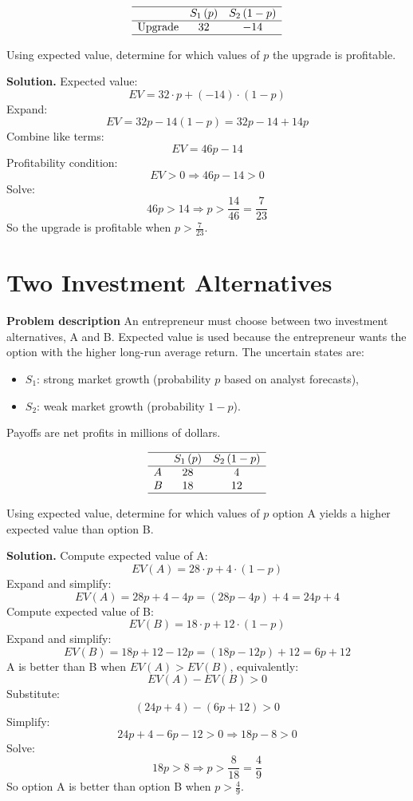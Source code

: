 \begin{ExamProblems}
		\[
		\begin{array}{lcc}
			\hline
			& S_1\,(p) & S_2\,(1-p) \\
			\hline
			\text{Upgrade} & 32 & -14 \\
			\hline
		\end{array}
		\]
		
		Using expected value, determine for which values of \(p\) the upgrade is profitable.
		
		\textbf{Solution.}
		Expected value:
		\[
		EV = 32\cdot p + (-14)\cdot(1-p)
		\]
		Expand:
		\[
		EV = 32p - 14(1-p) = 32p - 14 + 14p
		\]
		Combine like terms:
		\[
		EV = 46p - 14
		\]
		Profitability condition:
		\[
		EV>0 \Rightarrow 46p-14>0
		\]
		Solve:
		\[
		46p>14 \Rightarrow p>\frac{14}{46}=\frac{7}{23}
		\]
		So the upgrade is profitable when \(p>\frac{7}{23}\).
		
		
		\hypertarget{c7-ex3}{}
		\item
		\section{Two Investment Alternatives}
		
		\textbf{Problem description}
		An entrepreneur must choose between two investment alternatives, A and B. Expected value is used because the entrepreneur wants the option with the higher long-run average return. The uncertain states are:
		\begin{itemize}
			\item \(S_1\): strong market growth (probability \(p\) based on analyst forecasts),
			\item \(S_2\): weak market growth (probability \(1-p\)).
		\end{itemize}
		Payoffs are net profits in millions of dollars.
		
		\[
		\begin{array}{lcc}
			\hline
			& S_1\,(p) & S_2\,(1-p) \\
			\hline
			A & 28 & 4 \\
			B & 18 & 12 \\
			\hline
		\end{array}
		\]
		
		Using expected value, determine for which values of \(p\) option A yields a higher expected value than option B.
		
		\textbf{Solution.}
		Compute expected value of A:
		\[
		EV(A)=28\cdot p + 4\cdot(1-p)
		\]
		Expand and simplify:
		\[
		EV(A)=28p + 4 - 4p = (28p-4p)+4 = 24p+4
		\]
		Compute expected value of B:
		\[
		EV(B)=18\cdot p + 12\cdot(1-p)
		\]
		Expand and simplify:
		\[
		EV(B)=18p + 12 - 12p = (18p-12p)+12 = 6p+12
		\]
		A is better than B when \(EV(A)>EV(B)\), equivalently:
		\[
		EV(A)-EV(B)>0
		\]
		Substitute:
		\[
		(24p+4)-(6p+12)>0
		\]
		Simplify:
		\[
		24p+4-6p-12>0 \Rightarrow 18p-8>0
		\]
		Solve:
		\[
		18p>8 \Rightarrow p>\frac{8}{18}=\frac{4}{9}
		\]
		So option A is better than option B when \(p>\frac{4}{9}\).
		

\end{ExamProblems}
